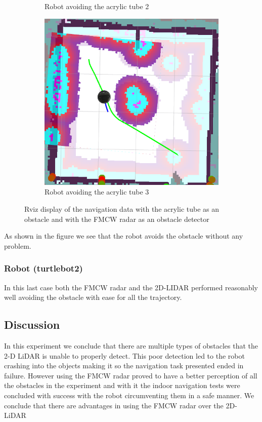 \begin{figure}[ht!]
\begin{subfigure}[t]{0.3\linewidth}
    \caption{Robot avoiding the acrylic tube 2}
    \label{fig::rvizglassradar2}
  \end{subfigure}
   \begin{subfigure}[t]{0.3\linewidth}
    \includegraphics[width=\linewidth]{imgs/chapter5/glassradar3.png}
    \caption{Robot avoiding the acrylic tube 3}
    \label{fig::rvizglassradar3}
  \end{subfigure}
  \caption[Navigation data with the acrylic tube  as an obstacle with the \ac{FMCW} \ac{radar}]{Rviz display of the navigation data with the acrylic tube  as an obstacle and with the \ac{FMCW} \ac{radar} as an obstacle detector}
  \label{fig::rvizglassradar}
\end{figure}
As shown in the figure we see that the robot avoids the obstacle without any problem.

\subsubsection{Robot  (turtlebot2) }
In this last case both the \ac{FMCW} \ac{radar} and the 2D-LIDAR performed reasonably well avoiding the obstacle with ease for all the trajectory.

\subsection{Discussion}
In this experiment we conclude that there are multiple types of obstacles that the 2-D LiDAR is unable to properly detect. This poor detection led to the robot crashing into the objects making it so the navigation task presented ended in failure. However using the \ac{FMCW} radar proved to have a better perception of all the obstacles in the experiment and with it the indoor navigation tests were concluded with success with the robot circumventing them in a safe manner. We conclude that there are advantages in using the \ac{FMCW} \ac{radar} over the 2D-\ac{LiDAR}



